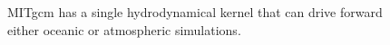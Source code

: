 \begin{figure}
\begin{center}
\end{center}
\caption{MITgcm has a single hydrodynamical kernel that can drive forward
either oceanic or atmospheric simulations.}
\label{fig:onemodel}
\end{figure}
